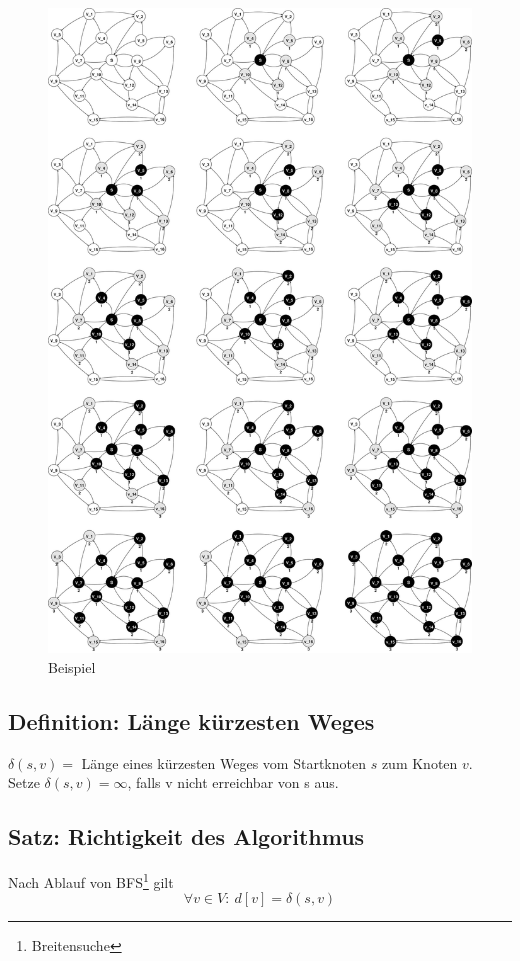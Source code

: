 \setlength{\headheight}{-50pt}
\vspace{-40pt}
\begin{figure}[H]
	\vspace*{50pt}
\centering
\includegraphics[width=0.85\linewidth]{16/Grafik/Diagramm}
\caption{Beispiel}
\label{fig:Diagramm}
\vspace{-80pt}
\end{figure}
\clearpage
\setlength{\headheight}{0pt}
\subsection{Definition: Länge kürzesten Weges}
$\delta(s,v)=$ Länge eines kürzesten Weges vom Startknoten $s$ zum Knoten $v$.\\
Setze $\delta(s,v)=\infty$, falls v nicht erreichbar von s aus.
\subsection{Satz: Richtigkeit des Algorithmus}
Nach Ablauf von BFS\footnote{Breitensuche} gilt 
\[ \forall v\in V: ~ d[v]=\delta(s,v) \]
